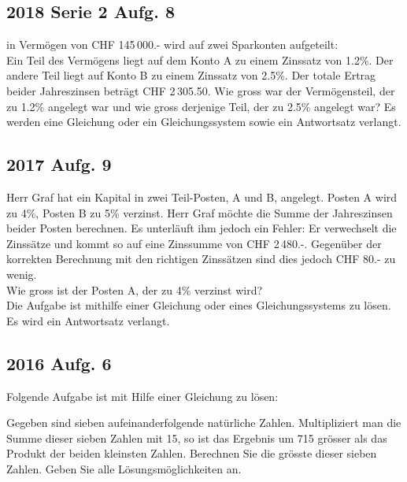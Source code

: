 \subsection{2018 Serie 2 Aufg. 8}
in Vermögen von CHF 145\,000.- wird auf zwei Sparkonten aufgeteilt:\\
Ein Teil des Vermögens liegt auf dem Konto A zu einem Zinssatz von 1.2\%.
Der andere Teil liegt auf Konto B zu einem Zinssatz von 2.5\%.
Der totale Ertrag beider Jahreszinsen beträgt CHF 2\,305.50.
Wie gross war der Vermögensteil, der zu 1.2\% angelegt war und wie gross
derjenige Teil, der zu 2.5\% angelegt war?
Es werden eine Gleichung oder ein Gleichungssystem sowie ein Antwortsatz
verlangt.


\subsection{2017 Aufg. 9}
Herr Graf hat ein Kapital in zwei Teil-Posten, A und B, angelegt. Posten A wird zu 4\%,
Posten B zu 5\% verzinst.
Herr Graf möchte die Summe der Jahreszinsen beider Posten berechnen. Es unterläuft
ihm jedoch ein Fehler: Er verwechselt die Zinssätze und kommt so auf eine Zinssumme
von CHF 2\,480.-. Gegenüber der korrekten Berechnung mit den richtigen Zinssätzen sind
dies jedoch CHF 80.- zu wenig.\\
Wie gross ist der Posten A, der zu 4\% verzinst wird?\\
Die Aufgabe ist mithilfe einer Gleichung oder eines Gleichungssystems zu lösen.\\
Es wird ein Antwortsatz verlangt.

\subsection{2016 Aufg. 6}
Folgende Aufgabe ist mit Hilfe einer Gleichung zu lösen:

Gegeben sind sieben aufeinanderfolgende natürliche Zahlen.
Multipliziert man die Summe dieser sieben Zahlen mit 15, so ist das Ergebnis um 715
grösser als das Produkt der beiden kleinsten Zahlen.
Berechnen Sie die grösste dieser sieben Zahlen. Geben Sie alle Lösungsmöglichkeiten
an.




